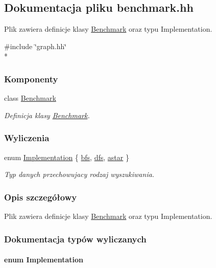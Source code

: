 \hypertarget{benchmark_8hh}{\subsection{Dokumentacja pliku benchmark.\-hh}
\label{benchmark_8hh}
}


Plik zawiera definicje klasy \hyperlink{class_benchmark}{Benchmark} oraz typu Implementation.  


{\ttfamily \#include \char`\"{}graph.\-hh\char`\"{}}\\*
\subsubsection*{Komponenty}
\begin{DoxyCompactItemize}
\item 
class \hyperlink{class_benchmark}{Benchmark}
\begin{DoxyCompactList}\small\item\em Definicja klasy \hyperlink{class_benchmark}{Benchmark}. \end{DoxyCompactList}\end{DoxyCompactItemize}
\subsubsection*{Wyliczenia}
\begin{DoxyCompactItemize}
\item 
enum \hyperlink{benchmark_8hh_a9107acb389f0886054bea6298a73e191}{Implementation} \{ \hyperlink{benchmark_8hh_a9107acb389f0886054bea6298a73e191a959b45298972c58c8cea0f81e9d04495}{bfs}, 
\hyperlink{benchmark_8hh_a9107acb389f0886054bea6298a73e191a1a01e4a8f21847034cc98ab41323694d}{dfs}, 
\hyperlink{benchmark_8hh_a9107acb389f0886054bea6298a73e191a12e7a8c530c6893fc3b6945d10dc94fe}{astar}
 \}
\begin{DoxyCompactList}\small\item\em Typ danych przechowujacy rodzaj wyszukiwania. \end{DoxyCompactList}\end{DoxyCompactItemize}


\subsubsection{Opis szczegółowy}
Plik zawiera definicje klasy \hyperlink{class_benchmark}{Benchmark} oraz typu Implementation. 

\subsubsection{Dokumentacja typów wyliczanych}
\hypertarget{benchmark_8hh_a9107acb389f0886054bea6298a73e191}{
\paragraph[{Implementation}]{\setlength{\rightskip}{0pt plus 5cm}enum {\bf Implementation}}}\label{benchmark_8hh_a9107acb389f0886054bea6298a73e191}


